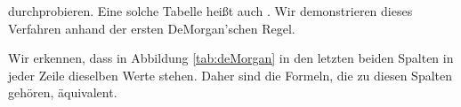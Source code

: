 durchprobieren.  Eine solche Tabelle heißt auch .
Wir demonstrieren dieses Verfahren anhand der ersten DeMorgan'schen Regel.
\begin{table}[!ht]
  \centering
{}
  \caption{Nachweis der ersten DeMorgan'schen Regel}
  \label{tab:deMorgan}
\end{table}
Wir erkennen, dass in Abbildung \ref{tab:deMorgan} in den letzten beiden Spalten in jeder Zeile dieselben Werte
stehen.  Daher sind die Formeln, die zu diesen Spalten gehören, äquivalent.

